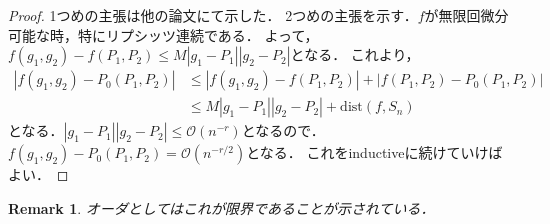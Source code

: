\documentclass{ujarticle}
\newtheorem*{rem}{Remark}
\begin{document}
\begin{proof}
  1つめの主張は他の論文にて示した．
  2つめの主張を示す．$f$が無限回微分可能な時，特にリプシッツ連続である．
  よって，$f(g_1,g_2)-f(P_1,P_2) \le M|g_1 - P_1||g_2 - P_2|$となる．
  これより，
  \begin{align*}
    |f(g_1,g_2)-P_0(P_1,P_2) |  & \le |f(g_1,g_2) - f(P_1,P_2)| +|  f(P_1,P_2) -P_0(P_1,P_2) | \\
    & \le M|g_1 - P_1||g_2 - P_2| +\mathrm{dist}(f,S_n)
  \end{align*}
となる．$|g_1 - P_1||g_2 - P_2|\le \mathcal{O}(n^{-r})$となるので．$f(g_1,g_2)-P_0(P_1,P_2) =\mathcal{O}(n^{-r/2})$となる．
これをinductiveに続けていけばよい．
\end{proof}
\begin{rem}
オーダとしてはこれが限界であることが示されている．
\end{rem}
\end{document}
